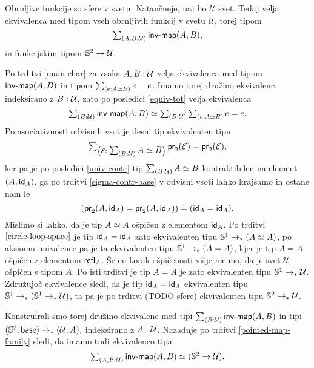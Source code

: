 \begin{izrek}
  Obrnljive funkcije so sfere v svetu. Natančneje, naj bo \(\mathcal{U}\) svet. Tedaj velja ekvivalenca med tipom vseh obrnljivih funkcij v svetu \(\mathcal{U}\), torej tipom \[{\textstyle \sum_{\left( A, B : \mathcal{U} \right)} \textnormal{\textsf{inv-map}}(A, B)},\] in funkcijskim tipom \(\mathbb{S}^{2} \to \mathcal{U}\).
\end{izrek}

\begin{dokaz}
  Po trditvi \ref{main-char} za vsaka \(A, B : \mathcal{U}\) velja ekvivalenca med tipom \(\textnormal{\textsf{inv-map}}(A, B)\) in tipom \(\textstyle \sum_{\left( e : A \simeq B \right)} e = e\). Imamo torej družino ekvivalenc, indeksirano z \(B : \mathcal{U}\), zato po posledici \ref{equiv-tot} velja ekvivalenca
  \[\textstyle \sum_{\left( B : \mathcal{U} \right)} \textnormal{\textsf{inv-map}}(A, B) \simeq \textstyle \sum_{\left( B : \mathcal{U} \right)} \textstyle \sum_{\left( e : A \simeq B \right)} e = e.\]
  Po asociativnosti odvisnih vsot je desni tip ekvivalenten tipu
  \[\textstyle \sum_{\left( \mathcal{E} : \textstyle \sum_{\left( B : \mathcal{U} \right)} A \simeq B \right)} \textnormal{\textsf{pr}}_{2}(\mathcal{E}) = \textnormal{\textsf{pr}}_{2}(\mathcal{E}),\]
  ker pa je po posledici \ref{univ-contr} tip \(\textstyle \sum_{\left( B : \mathcal{U} \right)} A \simeq B\) kontraktibilen na element \((A, \textnormal{\textsf{id}}_{A})\), ga po trditvi \ref{sigma-contr-base} v odvisni vsoti lahko krajšamo in ostane nam le
  \[(\textnormal{\textsf{pr}}_{2}(A, \textnormal{\textsf{id}}_{A}) = \textnormal{\textsf{pr}}_{2}(A, \textnormal{\textsf{id}}_{A})) \doteq (\textnormal{\textsf{id}}_{A} = \textnormal{\textsf{id}}_{A}).\]
  Mislimo si lahko, da je tip \(A \simeq A\) ošpičen z elementom \(\textnormal{\textsf{id}}_{A}\).
  Po trditvi \(\ref{circle-loop-space}\) je tip \(\textnormal{\textsf{id}}_{A} = \textnormal{\textsf{id}}_{A}\) zato ekvivalenten tipu \(\mathbb{S}^{1} \to_{\ast} (A \simeq A)\), po aksiomu univalence pa je ta ekvivalenten tipu
  \(\mathbb{S}^{1} \to_{\ast} (A = A)\), kjer je tip \(A = A\) ošpičen z elementom \(\textnormal{\textsf{refl}}_{A}\).
  Še en korak ošpičenosti višje recimo, da je svet \(\mathcal{U}\) ošpičen s tipom \(A\).
  Po isti trditvi je tip \(A = A\) je zato ekvivalenten tipu \(\mathbb{S}^{1} \to_{\ast} \mathcal{U}\).
  Združujoč ekvivalence sledi, da je tip \(\textnormal{\textsf{id}}_{A} = \textnormal{\textsf{id}}_{A}\) ekvivalenten tipu
  \(\mathbb{S}^{1} \to_{\ast} (\mathbb{S}^{1} \to_{\ast} \mathcal{U})\), ta pa je po trditvi (TODO sfere) ekvivalenten tipu \(\mathbb{S}^{2} \to_{\ast} \mathcal{U}\).

  Konstruirali smo torej družino ekvivalenc med tipi \(\textstyle \sum_{\left( B : \mathcal{U} \right)} \textnormal{\textsf{inv-map}}(A, B)\) in tipi \((\mathbb{S}^{2}, \textnormal{\textsf{base}}) \to_{\ast} (\mathcal{U}, A),\) indeksirano z \(A : \mathcal{U}\).
  Nazadnje po trditvi \ref{pointed-map-family} sledi, da imamo tudi ekvivalenco tipa
  \[\textstyle \sum_{\left( A, B : \mathcal{U} \right)} \textnormal{\textsf{inv-map}}(A, B) \simeq (\mathbb{S}^{2} \to \mathcal{U}).\]
\end{dokaz}

